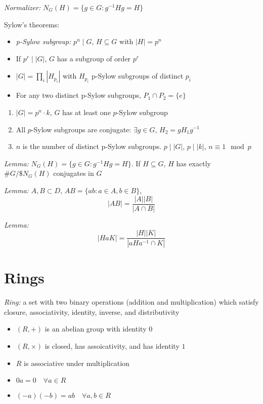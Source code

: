 \documentclass[9pt]{memoir}
\newcommand{\abs}[1]{\left\vert #1 \right\vert}
\begin{document}
\begin{multicols}{2}
    \emph{Normalizer:} $N_G(H) = \{g\in G: g^{-1}Hg = H\}$

    Sylow's theorems:
    \begin{itemize}
        \item \emph{p-Sylow subgroup:} $p^n \mid G$, $H \subseteq G$ with $\abs{H} = p^n$
        \item If $p^r \mid \abs{G}$, $G$ has a subgroup of order $p^r$
        \item $\abs{G} = \prod_i \abs{H_{p_i}}$ with $H_{p_i}$ p-Sylow subgroups of distinct $p_i$
        \item For any two distinct p-Sylow subgroups, $P_1 \cap P_2 = \{e\}$
    \end{itemize}
    \begin{enumerate}
        \item $\abs{G} = p^n\cdot k$, $G$ has at least one $p$-Sylow subgroup
        \item All $p$-Sylow subgroups are conjugate: $\exists g \in G$, $H_2 = gH_1g^{-1}$
        \item $n$ is the number of distinct p-Sylow subgroups. $p \mid \abs{G}$, $p \mid \abs{k}$, $n \equiv 1 \mod p$
    \end{enumerate}

    \emph{Lemma:} $N_G(H) = \{g\in G: g^{-1}Hg = H\}$. If $H \subseteq G$, $H$ has exactly $\#G/\$N_G(H)$ conjugates in $G$ 

    \emph{Lemma:} $A, B \subset D$, $AB = \{ab: a \in A, b \in B\}$, 
    \[\abs{AB} = \frac{\abs{A}\abs{B}}{\abs{A \cap B}}\]

    \emph{Lemma:} 
    \[\abs{HaK} = \frac{\abs{H}\abs{K}}{\abs{aHa^{-1} \cap K}}\]


\section*{Rings}
    \emph{Ring:} a set with two binary operations (addition and multiplication) which satisfy closure, associativity, identity, inverse, and distributivity
    \begin{itemize}
        \item $(R, +)$ is an abelian group with identity $0$
        \item $(R, \times)$ is closed, has assoicativity, and has identity $1$
        \item $R$ is associative under multiplication
        \item $0a = 0 \quad \forall a \in R$
        \item $(-a)(-b) = ab \quad \forall a, b \in R$
    \end{itemize}


\end{multicols}
\end{document}
